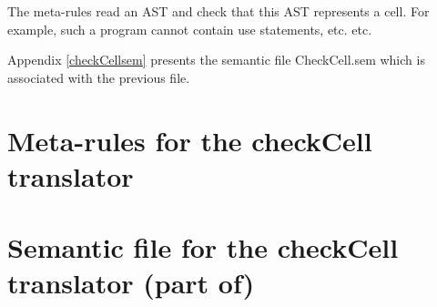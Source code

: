\documentclass[12pt]{article}
\begin{document}
The meta-rules read an AST and check that this AST represents a cell.
 For example, such a program cannot contain use statements, etc.
 etc.

Appendix \ref{checkCellsem}
 presents the semantic file CheckCell.sem which is associated with the previous
 file.

\appendix




\section{Meta-rules for the checkCell translator\label{checkCellmeta}}



\section{Semantic file for the checkCell translator (part of)
\label{checkCellSem}}


\end{document}
